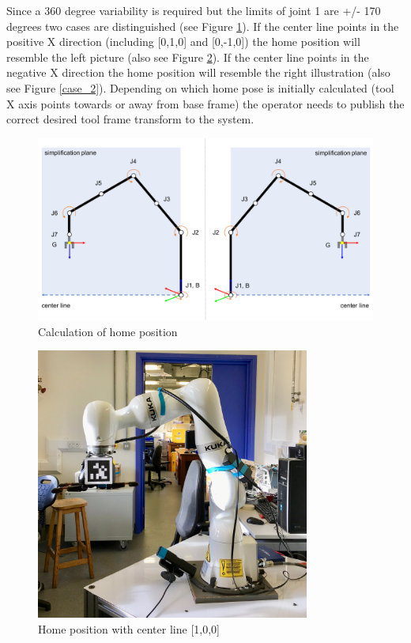 \documentclass[headsepline,footinclude=false,fontsize=11pt,paper=a4,listof=totoc,bibliography=totoc,BCOR=12mm,DIV=14]{scrbook}
\begin{document}
\newpage
Since a 360 degree variability is required but the limits of joint 1 are +/- 170 degrees two cases are distinguished (see Figure \ref{fig:home_position}). If the center line points in the positive X direction (including [0,1,0] and [0,-1,0]) the home position will resemble the left picture (also see Figure \ref{case_1}). If the center line points in the negative X direction the home position will resemble the right illustration (also see Figure \ref{case_2}). Depending on which home pose is initially calculated (tool X axis points towards or away from base frame) the operator needs to publish the correct desired tool frame transform to the system.

\begin{figure}[h!]
    \centering
    \includegraphics[width=\textwidth]{images/home_position}
    \caption{Calculation of home position}
    \label{fig:home_position}
\end{figure}

\newpage
\vfill
\begin{figure}[h!]
    \centering
    \includegraphics[width=9cm]{figures/case_1}
    \caption{Home position with center line [1,0,0]}
    \label{case_1}
\end{figure}
\end{document}
